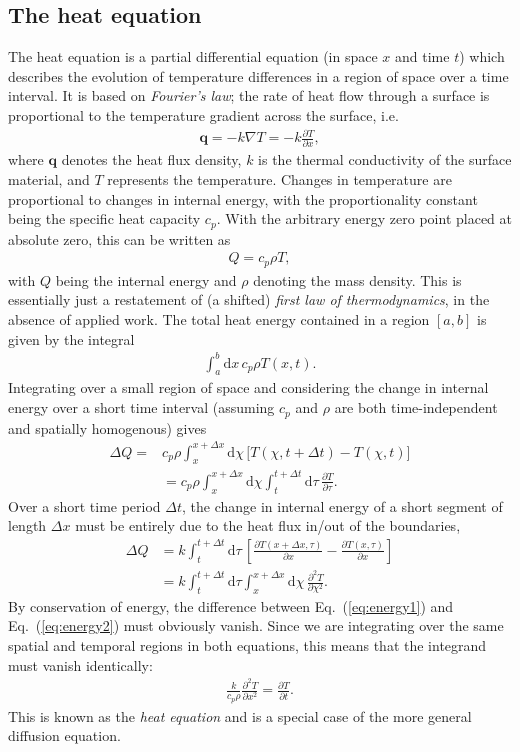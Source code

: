 \documentclass[a4paper, twocolumn]{article}
\newcommand{\eq} [1]{Eq.\ (\ref{eq:#1})}
\begin{document}
\subsection{The heat equation}
The heat equation is a partial differential equation (in space $x$ and time $t$) which describes the evolution of temperature differences in a region of space over a time interval. It is based on \textit{Fourier's law}; the rate of heat flow through a surface is proportional to the temperature gradient across the surface, i.e.\
\begin{align}
\mathbf{q}=-k\nabla T = -k \frac{\partial T}{\partial x},
\end{align}
where $\mathbf{q}$ denotes the heat flux density, $k$ is the thermal conductivity of the surface material, and $T$ represents the temperature. Changes in temperature are proportional to changes in internal energy, with the proportionality constant being the specific heat capacity $c_p$. With the arbitrary energy zero point placed at absolute zero, this can be written as
\begin{align}
Q = c_p \rho T,
\end{align}
with $Q$ being the internal energy and $\rho$ denoting the mass density. This is essentially just a restatement of (a shifted) \textit{first law of thermodynamics}, in the absence of applied work. The total heat energy contained in a region $[a,b]$ is given by the integral
\begin{align}
\int_a^b\mathrm{d}x\,c_p\rho T(x,t).
\end{align}
Integrating over a small region of space and considering the change in internal energy over a short time interval (assuming $c_p$ and $\rho$ are both time-independent and spatially homogenous) gives 
\begin{align}
\Delta Q=& c_p \rho\int_{x}^{x+\Delta x}\mathrm{d}\chi\,\Big[T(\chi,t+\Delta t) - T(\chi,t)\Big] \nonumber \\
&= c_p\rho \int_x^{x+\Delta x}\mathrm{d}\chi\int_{t}^{t+\Delta t}\mathrm{d}\tau\,\frac{\partial T}{\partial \tau}. \label{eq:energy1}
\end{align}
Over a short time period $\Delta t$, the change in internal energy of a short segment of length $\Delta x$  must be entirely due to the heat flux in/out of the boundaries,
\begin{align}
\Delta Q &= k\int_t^{t+\Delta t}\mathrm{d}\tau\,\left[\frac{\partial T(x+\Delta x,\tau)}{\partial x} - \frac{\partial T(x,\tau)}{\partial x} \right] \nonumber \\
%
&= k\int_t^{t+\Delta t}\mathrm{d}\tau\int_x^{x+\Delta x}\mathrm{d}\chi\,\frac{\partial^2 T}{\partial \chi^2}. \label{eq:energy2}
\end{align}
By conservation of energy, the difference between \eq{energy1} and \eq{energy2} must obviously vanish. Since we are integrating over the same spatial and temporal regions in both equations, this means that the integrand must vanish identically:
\begin{align}
\frac{k}{c_p\rho} \frac{\partial^2 T}{\partial x^2} = \frac{\partial T}{\partial t}. \label{eq:heat}
\end{align}
This is known as the \textit{heat equation} and is a special case of the more general diffusion equation. 
\end{document}
